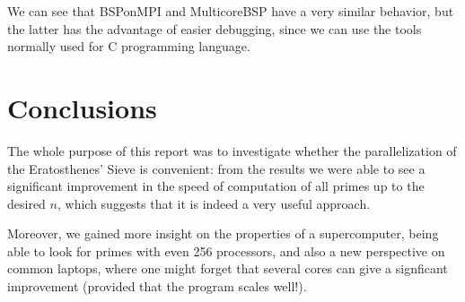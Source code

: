 \documentclass[a4paper,11pt]{article}
\begin{document}
We can see that BSPonMPI and MulticoreBSP have a very similar behavior, but the latter has the advantage of easier debugging, since we can use the tools normally used for C programming language.

\section{Conclusions}

The whole purpose of this report was to investigate whether the parallelization of the Eratosthenes' Sieve is convenient: from the results we were able to see a significant improvement in the speed of computation of all primes up to the desired $n$, which suggests that it is indeed a very useful approach.

Moreover, we gained more insight on the properties of a supercomputer, being able to look for primes with even 256 processors, and also a new perspective on common laptops, where one might forget that several cores can give a signficant improvement (provided that the program scales well!).
\end{document}
